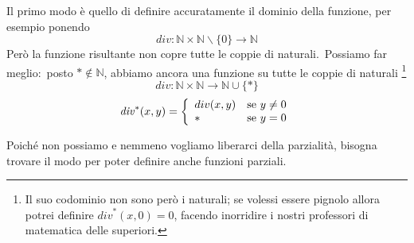 \begin{example}
    Il primo modo è quello di definire accuratamente il dominio della funzione, per esempio ponendo
    \[\mathit{div} : \mathbb{N} \times \mathbb{N}\backslash \{0\} \rightarrow \mathbb{N}\]
    Però la funzione risultante non copre tutte le coppie di naturali.\
    Possiamo far meglio:\ posto $* \notin \mathbb{N}$, abbiamo ancora una funzione su tutte le coppie di naturali \footnote{Il suo codominio non sono però i naturali; se volessi essere pignolo allora potrei definire $\mathit{div}^*(x,0) = 0$, facendo inorridire i nostri professori di matematica delle superiori.}
    \[\mathit{div} : \mathbb{N} \times \mathbb{N} \rightarrow \mathbb{N} \cup \{*\}\]
    \[\mathit{div}^*(x,y) = \left\{\begin{array}{l l}
            div(x,y) & \mathrm{se}\ y\neq 0 \\
            *        & \mathrm{se}\ y = 0   \\
        \end{array}\right.\]
\end{example}

\noindent Poiché non possiamo e nemmeno vogliamo liberarci della parzialità, bisogna trovare il modo per poter definire anche funzioni parziali.
